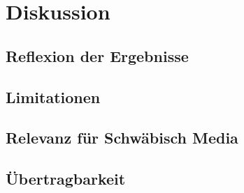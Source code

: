 \section{Diskussion}
\subsection{Reflexion der Ergebnisse}

\subsection{Limitationen}

\subsection{Relevanz für Schwäbisch Media}

\subsection{Übertragbarkeit}
